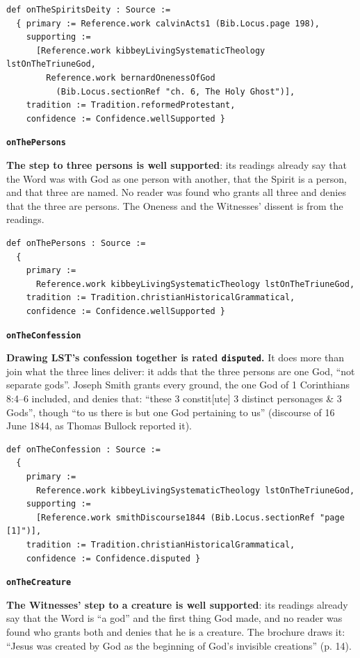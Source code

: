 \documentclass[11pt,paper=\testimonypaper,DIV=13,parskip=false]{scrartcl}
\begin{document}
{\small\begin{verbatim}
def onTheSpiritsDeity : Source :=
  { primary := Reference.work calvinActs1 (Bib.Locus.page 198),
    supporting :=
      [Reference.work kibbeyLivingSystematicTheology lstOnTheTriuneGod,
        Reference.work bernardOnenessOfGod
          (Bib.Locus.sectionRef "ch. 6, The Holy Ghost")],
    tradition := Tradition.reformedProtestant,
    confidence := Confidence.wellSupported }
\end{verbatim}}
\par\medskip\noindent\textbf{\texttt{on\allowbreak{}The\allowbreak{}Persons}}\par\nobreak\noindent
\textbf{The step to three persons is well supported}: its readings already say that the Word was with God as one person with another, that the Spirit is a person, and that three are named. No reader was found who grants all three and denies that the three are persons. The Oneness and the Witnesses’ dissent is from the readings.

{\small\begin{verbatim}
def onThePersons : Source :=
  {
    primary :=
      Reference.work kibbeyLivingSystematicTheology lstOnTheTriuneGod,
    tradition := Tradition.christianHistoricalGrammatical,
    confidence := Confidence.wellSupported }
\end{verbatim}}
\par\medskip\noindent\textbf{\texttt{on\allowbreak{}The\allowbreak{}Confession}}\par\nobreak\noindent
\textbf{Drawing LST’s confession together is rated \texttt{disputed}.} It does more than join what the three lines deliver: it adds that the three persons are one God, “not separate gods”. Joseph Smith grants every ground, the one God of 1 Corinthians 8:4–6 included, and denies that: “these 3 constit[ute] 3 distinct personages \& 3 Gods”, though “to us there is but one God pertaining to us” (discourse of 16 June 1844, as Thomas Bullock reported it).

{\small\begin{verbatim}
def onTheConfession : Source :=
  {
    primary :=
      Reference.work kibbeyLivingSystematicTheology lstOnTheTriuneGod,
    supporting :=
      [Reference.work smithDiscourse1844 (Bib.Locus.sectionRef "page [1]")],
    tradition := Tradition.christianHistoricalGrammatical,
    confidence := Confidence.disputed }
\end{verbatim}}
\par\medskip\noindent\textbf{\texttt{on\allowbreak{}The\allowbreak{}Creature}}\par\nobreak\noindent
\textbf{The Witnesses’ step to a creature is well supported}: its readings already say that the Word is “a god” and the first thing God made, and no reader was found who grants both and denies that he is a creature. The brochure draws it: “Jesus was created by God as the beginning of God’s invisible creations” (p. 14).
\end{document}
